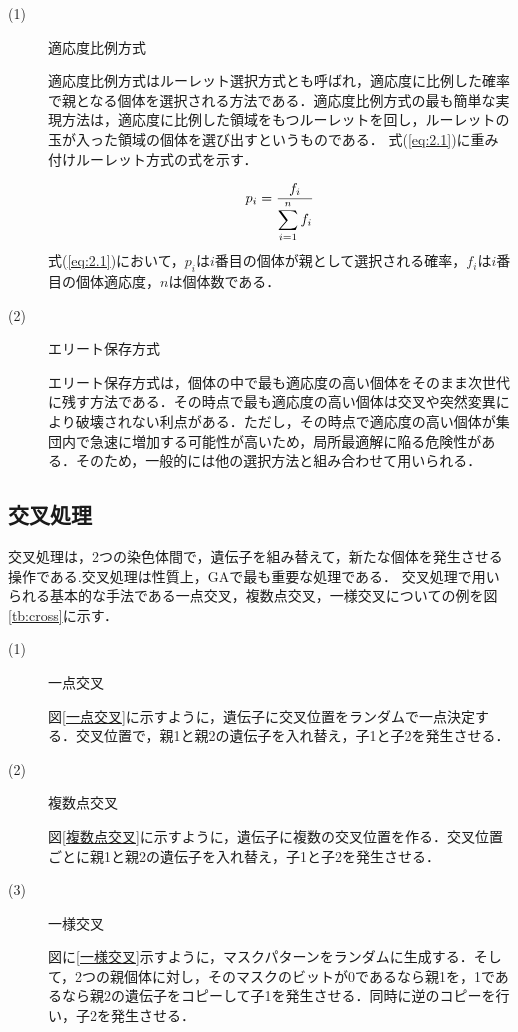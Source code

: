\begin{description}
\item[ (1) ]適応度比例方式

適応度比例方式はルーレット選択方式とも呼ばれ，適応度に比例した確率で親となる個体を選択される方法である．適応度比例方式の最も簡単な実現方法は，適応度に比例した領域をもつルーレットを回し，ルーレットの玉が入った領域の個体を選び出すというものである．
式(\ref{eq:2.1})に重み付けルーレット方式の式を示す．



\begin{equation}
\vspace{1.0cm}
{p_i}=\frac{f_i}{\displaystyle\sum_{i=1}^{n}f_i}
\label{eq:2.1}
\vspace{-0.5cm}
\end{equation}
式(\ref{eq:2.1})において，$p_i$は$i$番目の個体が親として選択される確率，$f_i$は$i$番目の個体適応度，$n$は個体数である．

\item[ (2) ]エリート保存方式

エリート保存方式は，個体の中で最も適応度の高い個体をそのまま次世代に残す方法である．その時点で最も適応度の高い個体は交叉や突然変異により破壊されない利点がある．ただし，その時点で適応度の高い個体が集団内で急速に増加する可能性が高いため，局所最適解に陥る危険性がある．そのため，一般的には他の選択方法と組み合わせて用いられる．

\end{description}

\newpage

\subsection{交叉処理}
\label{sec2.1.4}

交叉処理は，2つの染色体間で，遺伝子を組み替えて，新たな個体を発生させる操作である.交叉処理は性質上，GAで最も重要な処理である．
交叉処理で用いられる基本的な手法である一点交叉，複数点交叉，一様交叉についての例を図\ref{tb:cross}に示す．



\begin{description}
\item[ (1) ]一点交叉

図\ref{一点交叉}に示すように，遺伝子に交叉位置をランダムで一点決定する．交叉位置で，親1と親2の遺伝子を入れ替え，子1と子2を発生させる．


\item[ (2) ]複数点交叉

図\ref{複数点交叉}に示すように，遺伝子に複数の交叉位置を作る．交叉位置ごとに親1と親2の遺伝子を入れ替え，子1と子2を発生させる．

\item[ (3) ]一様交叉

図に\ref{一様交叉}示すように，マスクパターンをランダムに生成する．そして，2つの親個体に対し，そのマスクのビットが0であるなら親1を，1であるなら親2の遺伝子をコピーして子1を発生させる．同時に逆のコピーを行い，子2を発生させる．

\end{description}

